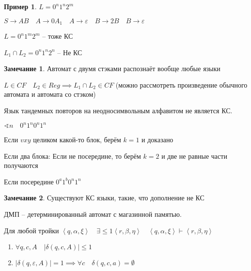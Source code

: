 \documentclass{book}
\renewcommand\O{\ensuremath{\emptyset}}
\theoremstyle{definition}
\newtheorem*{note}{Замечание}
\newtheorem*{example}{Пример}
\begin{document}
\begin{example}
    $L = 0^n 1^n 2^m$

    $S \to AB\quad A \to 0A_1\quad A \to \varepsilon\quad B \to 2 B\quad B \to  \varepsilon$

    $L = 0^n 1^m 2^m$ -- тоже КС

     $L_1 \cap L_2 = 0^n 1^n 2^n$ -- Не КС
\end{example}

\begin{note}
    Автомат с двумя стэками распознаёт вообще любые языки
\end{note}

\begin{theorem}
    $L\in CF\quad L_2\in Reg \implies L_1\cap L_2\in CF$ (можно рассмотреть произведение обычного автомата и автомата со стэком)
\end{theorem}

\begin{theorem}
    Язык тандемных повторов на неодносимвольным алфавитом не является КС.

    $\sphericalangle n\quad 0^n 1^n 0^n 1^n$

    Если $vxy$ целиком какой-то блок, берём  $k=1$ и доказано

    Если два блока: 
    Если не посередине, то берём $k=2$ и две не равные части получаются

    Если посередине  $0^a 1^b 0^n 1^n\quad$
\end{theorem}

\begin{note}
    Существуют КС языки, такие, что дополнение не КС
\end{note}

\begin{definition}
    ДМП -- детерминированный автомат с магазинной памятью.

    Для любой тройки $\left<q, \alpha, \xi \right> \quad \exists \leqslant 1 \left<r, \beta, \eta \right>\quad \left<q, \alpha, \xi \right>\vdash \left<r, \beta, \eta \right>$


    \begin{enumerate}
        \item 
    $\forall q, c, A\quad \left| \delta\left( q, c, A \right)  \right| \leqslant 1$
\item $\left| \delta(q, \varepsilon, A) \right|  = 1 \implies \forall c\quad \delta(q,c,a) = \O $
    \end{enumerate}
\end{definition}
\end{document}
